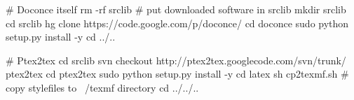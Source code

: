 \documentclass[%
oneside,                 %
final,                   %
10pt]{article}
\begin{document}
# Doconce itself
rm -rf srclib   # put downloaded software in srclib
mkdir srclib
cd srclib
hg clone https://code.google.com/p/doconce/
cd doconce
sudo python setup.py install -y
cd ../..

# Ptex2tex
cd srclib
svn checkout http://ptex2tex.googlecode.com/svn/trunk/ ptex2tex
cd ptex2tex
sudo python setup.py install -y
cd latex
sh cp2texmf.sh  # copy stylefiles to ~/texmf directory
cd ../../..
\eccq



\printindex
\end{document}
